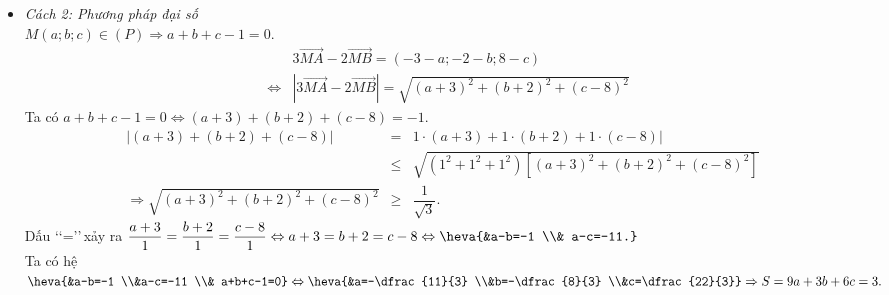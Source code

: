 \begin{ex}
{\begin{itemize}
$${				&c=\dfrac{22}{3}}
				\Rightarrow S=9a+3b+6c=3.
		$$
	\item \textit{Cách 2: Phương pháp đại số}\,\\
	$M(a ; b ; c) \in(P) \Rightarrow a+b+c-1=0.$
	\begin{eqnarray*}
		& & 3 \vec{M A}-2 \vec{M B}=(-3-a ;-2-b ; 8-c)\\
		&\Leftrightarrow & |3 \vec{M A}-2 \vec{M B}|=\sqrt{(a+3)^2+(b+2)^2+(c-8)^2}
	\end{eqnarray*}
		Ta có $a+b+c-1=0 \Leftrightarrow(a+3)+(b+2)+(c-8)=-1$.
		\begin{eqnarray*}
			|(a+3)+(b+2)+(c-8)|
			&=& 1 \cdot(a+3)+1 \cdot(b+2)+1 \cdot(c-8)| \\
			&\leq & \sqrt{\left(1^2+1^2+1^2\right)\left[(a+3)^2+(b+2)^2+(c-8)^2\right]} \\
			\Rightarrow \sqrt{(a+3)^2+(b+2)^2+(c-8)^2} &\geq& \dfrac{1}{\sqrt{3}}.
		\end{eqnarray*}
		Dấu \lq\lq =\rq\rq\,xảy ra $\dfrac{a+3}{1}=\dfrac{b+2}{1}=\dfrac{c-8}{1} \Leftrightarrow a+3=b+2=c-8 \Leftrightarrow\heva{&a-b=-1 \\& a-c=-11.}$\\
		Ta có hệ $\heva{&a-b=-1 \\&a-c=-11 \\& a+b+c-1=0} \Leftrightarrow\heva{&a=-\dfrac{11}{3} \\&b=-\dfrac{8}{3} \\&c=\dfrac{22}{3}}\Rightarrow S=9a+3b+6c=3.$		
	\end{itemize}
	}
\end{ex}

